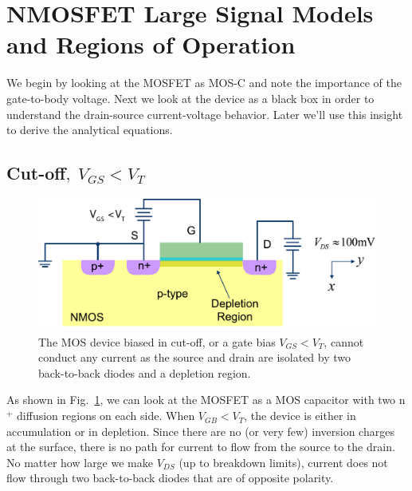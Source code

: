 \section{NMOSFET Large Signal Models and Regions of Operation}
We begin by looking at the MOSFET as MOS-C and note the importance of the gate-to-body voltage.  Next we look at the device as a black box in order to understand the drain-source current-voltage behavior.  Later we'll use this insight to derive the analytical equations.
\subsection{Cut-off\texorpdfstring{$,\;V_{GS}<V_T$}{}}
\begin{figure}[tb]
\centering
\includegraphics[width=.75\columnwidth]{mos_cutoff}
\caption{The MOS device biased in cut-off, or a gate bias $V_{GS} < V_T$, cannot conduct any current as the source and drain are isolated by two back-to-back diodes and a depletion region.}
\label{fig:mos_cutoff}
\end{figure}
As shown in Fig.~\ref{fig:mos_cutoff}, we can look at the MOSFET as a MOS capacitor with two n$^+$ diffusion regions on each side. When $V_{GB} < V_T$, the device is either in accumulation or in depletion. Since there are no (or very few) inversion charges at the surface, there is no path for current to flow from the source to the drain.  No matter how large we make $V_{DS}$ (up to breakdown limits), current does not flow through two back-to-back diodes that are of opposite polarity.
